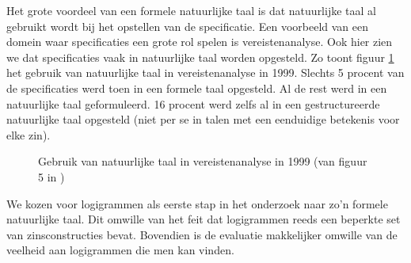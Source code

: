 
Het grote voordeel van een formele natuurlijke taal is dat natuurlijke taal al gebruikt wordt bij het opstellen van de specificatie. Een voorbeeld van een domein waar specificaties een grote rol spelen is vereistenanalyse. Ook hier zien we dat specificaties vaak in natuurlijke taal worden opgesteld. Zo toont figuur \ref{fig:natural-language-use} het gebruik van natuurlijke taal in vereistenanalyse in 1999. Slechts 5 procent van de specificaties werd toen in een formele taal opgesteld. Al de rest werd in een natuurlijke taal geformuleerd. 16 procent werd zelfs al in een gestructureerde natuurlijke taal opgesteld (niet per se in talen met een eenduidige betekenis voor elke zin).

\begin{figure}
  \caption[Gebruik van natuurlijke taal in vereistenanalyse]{Gebruik van natuurlijke taal in vereistenanalyse in 1999 (van figuur 5 in \cite{Luisa2004})}
  \label{fig:natural-language-use}
\end{figure}

We kozen voor logigrammen als eerste stap in het onderzoek naar zo'n formele natuurlijke taal. Dit omwille van het feit dat logigrammen reeds een beperkte set van zinsconstructies bevat. Bovendien is de evaluatie makkelijker omwille van de veelheid aan logigrammen die men kan vinden.
